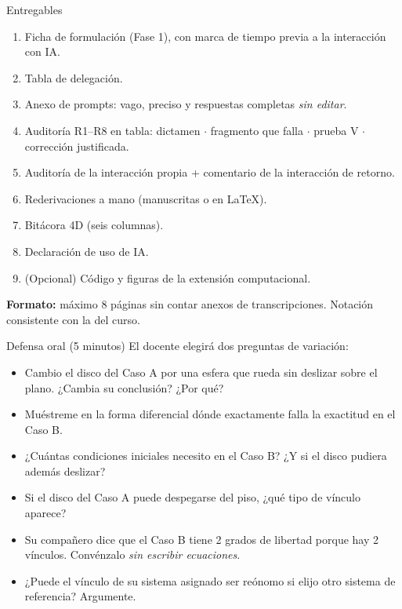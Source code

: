 \documentclass[10pt,aspectratio=169]{beamer}
\begin{document}
\begin{frame}{Entregables}
  \small
  \begin{enumerate}
    \item Ficha de formulación (Fase 1), con marca de tiempo previa a la interacción con IA.
    \item Tabla de delegación.
    \item Anexo de prompts: vago, preciso y respuestas completas \emph{sin editar}.
    \item Auditoría R1--R8 en tabla: dictamen $\cdot$ fragmento que falla $\cdot$ prueba V $\cdot$ corrección justificada.
    \item Auditoría de la interacción propia + comentario de la interacción de retorno.
    \item Rederivaciones a mano (manuscritas o en \LaTeX).
    \item Bitácora 4D (seis columnas).
    \item Declaración de uso de IA.
    \item (Opcional) Código y figuras de la extensión computacional.
  \end{enumerate}
  \vspace{0.3em}
  \textbf{Formato:} máximo 8 páginas sin contar anexos de transcripciones. Notación consistente con la del curso.
\end{frame}

\begin{frame}{Defensa oral (5 minutos)}
  El docente elegirá dos preguntas de variación:
  \begin{itemize}\small
    \item Cambio el disco del Caso A por una esfera que rueda sin deslizar sobre el plano. ¿Cambia su conclusión? ¿Por qué?
    \item Muéstreme en la forma diferencial dónde exactamente falla la exactitud en el Caso B.
    \item ¿Cuántas condiciones iniciales necesito en el Caso B? ¿Y si el disco pudiera además deslizar?
    \item Si el disco del Caso A puede despegarse del piso, ¿qué tipo de vínculo aparece?
    \item Su compañero dice que el Caso B tiene 2 grados de libertad porque hay 2 vínculos. Convénzalo \emph{sin escribir ecuaciones}.
    \item ¿Puede el vínculo de su sistema asignado ser reónomo si elijo otro sistema de referencia? Argumente.
  \end{itemize}
\end{frame}
\end{document}
